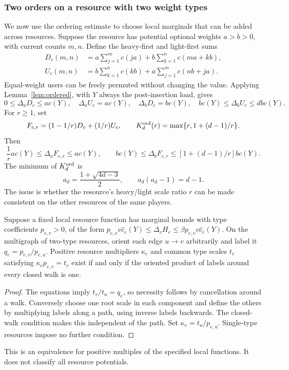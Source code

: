 \documentclass[manuscript,review,anonymous]{acmart}
\begin{document}
\subsubsection{Two orders on a resource with two weight types}
We now use the ordering estimate to choose local marginals that can be added across resources.
Suppose the resource has potential optional weights $a>b>0$, with current counts $m,n$. Define the heavy-first and light-first sums
\begin{align}
 D_c(m,n)&=a\sum_{j=1}^mc(ja)+b\sum_{k=1}^nc(ma+kb),\label{eq:D}\\
 U_c(m,n)&=b\sum_{k=1}^nc(kb)+a\sum_{j=1}^mc(nb+ja).\label{eq:U}
\end{align}
Equal-weight users can be freely permuted without changing the value. Applying Lemma~\ref{lem:ordered}, with $Y$ always the post-insertion load, gives
\begin{equation}\label{eq:four}
 0\le\Delta_aD_c\le ac(Y),\quad\Delta_aU_c=ac(Y),\quad
 \Delta_bD_c=bc(Y),\quad bc(Y)\le\Delta_bU_c\le dbc(Y).
\end{equation}
For $r\ge1$, set
\[
 F_{c,r}=(1-1/r)D_c+(1/r)U_c,\qquad
 K_d^{\rm ord}(r)=\max\{r,1+(d-1)/r\}.
\]
Then
\begin{equation}\label{eq:blendmarginals}
 \frac1r ac(Y)\le\Delta_aF_{c,r}\le ac(Y),\qquad
 bc(Y)\le\Delta_bF_{c,r}\le[1+(d-1)/r]bc(Y).
\end{equation}
The minimum of $K_d^{\rm ord}$ is
\begin{equation}\label{eq:sqrtfactor}
 a_d=\frac{1+\sqrt{4d-3}}2,\qquad a_d(a_d-1)=d-1.
\end{equation}
The issue is whether the resource's heavy/light scale ratio $r$ can be made consistent on the other resources of the same players.

\begin{proposition}\label{prop:fixedscales}
Suppose a fixed local resource function has marginal bounds with type coefficients $p_{e,v}>0$, of the form $p_{e,v}v\widehat c_e(Y)\le\Delta_vH_e\le\beta p_{e,v}v\widehat c_e(Y)$. On the multigraph of two-type resources, orient each edge $u\to v$ arbitrarily and label it $q_e=p_{e,v}/p_{e,u}$. Positive resource multipliers $\kappa_e$ and common type scales $t_v$ satisfying $\kappa_ep_{e,v}=t_v$ exist if and only if the oriented product of labels around every closed walk is one.
\end{proposition}
\begin{proof}
The equations imply $t_v/t_u=q_e$, so necessity follows by cancellation around a walk. Conversely choose one root scale in each component and define the others by multiplying labels along a path, using inverse labels backwards. The closed-walk condition makes this independent of the path. Set $\kappa_e=t_u/p_{e,u}$. Single-type resources impose no further condition.
\end{proof}
This is an equivalence for positive multiples of the specified local functions. It does not classify all resource potentials.
\end{document}
